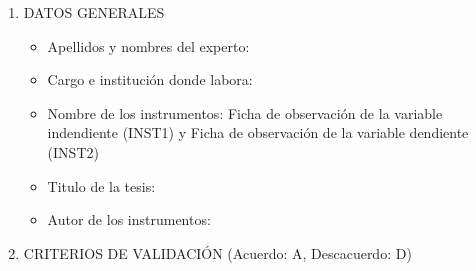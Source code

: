 \documentclass[12pt,a4paper]{article}
\begin{document}
\begin{enumerate}
	\item DATOS GENERALES
	      \begin{itemize}
		      \item Apellidos y nombres del experto: \dotfill
		      \item Cargo e institución donde labora: \dotfill
		      \item Nombre de los instrumentos: Ficha de observación de la  variable indendiente (INST1) y Ficha de observación de la  variable dendiente (INST2)
		      \item Titulo de la tesis: \titulo
		      \item Autor de los instrumentos: \autor
	      \end{itemize}

	\item CRITERIOS DE VALIDACIÓN (Acuerdo: A, Descacuerdo: D)


\end{enumerate}
\end{document}
